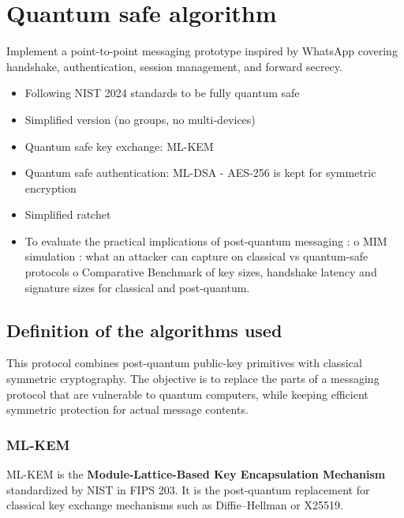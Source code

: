 \documentclass{article}
\begin{document}
      \section{Quantum safe algorithm}
      Implement a point-to-point messaging prototype inspired by WhatsApp
      covering handshake, authentication, session management, and forward secrecy.
      \begin{itemize}
            \item Following NIST 2024 standards to be fully quantum safe

            \item Simplified version (no groups, no multi-devices)

            \item Quantum safe key exchange: ML-KEM

            \item Quantum safe authentication: ML-DSA - AES-256 is kept for
                  symmetric encryption

            \item Simplified ratchet

            \item To evaluate the practical implications of post-quantum messaging
                  : o MIM simulation : what an attacker can capture on classical
                  vs quantum-safe protocols o Comparative Benchmark of key sizes,
                  handshake latency and signature sizes for classical and post-quantum.
      \end{itemize}

      \subsection{Definition of the algorithms used}
      This protocol combines post-quantum public-key primitives with classical
      symmetric cryptography. The objective is to replace the parts of a
      messaging protocol that are vulnerable to quantum computers, while keeping
      efficient symmetric protection for actual message contents.

      \subsubsection{ML-KEM}
      ML-KEM is the \textbf{Module-Lattice-Based Key Encapsulation Mechanism}
      standardized by NIST in FIPS 203. It is the post-quantum replacement for
      classical key exchange mechanisms such as Diffie--Hellman or X25519.
\end{document}
